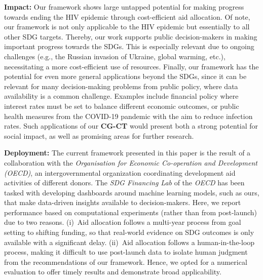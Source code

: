 \documentclass[sigconf]{acmart}
\newcommand{\framework}{\textbf{\mbox{CG-CT}}\xspace}
\begin{document}
\textbf{Impact:} Our framework shows large untapped potential for making progress towards ending the HIV epidemic through cost-efficient aid allocation. Of note, our framework is not only applicable to the HIV epidemic but essentially to all other SDG targets. Thereby, our work supports public decision-makers in making important progress towards the SDGs. This is especially relevant due to ongoing challenges (e.g., the Russian invasion of Ukraine, global warming, etc.), necessitating a more cost-efficient use of resources. Finally, our framework has the potential for even more general applications beyond the SDGs, since it can be relevant for many decision-making problems from public policy, where data availability is a common challenge. Examples include financial policy where interest rates must be set to balance different economic outcomes, or public health measures from the COVID-19 pandemic with the aim to reduce infection rates. Such applications of our \framework would present both a strong potential for social impact, as well as promising areas for further research.

\textbf{Deployment:} The current framework presented in this paper is the result of a collaboration with the \emph{Organisation for Economic Co-operation and Development (OECD)}, an intergovernmental organization coordinating development aid activities of different donors. The \emph{SDG Financing Lab} of the \emph{OECD} has been tasked with developing dashboards around machine learning models, such as ours, that make data-driven insights available to decision-makers. Here, we report performance based on computational experiments (rather than from post-launch) due to two reasons. (i)~Aid allocation follows a multi-year process from goal setting to shifting funding, so that real-world evidence on SDG outcomes is only available with a significant delay. (ii)~Aid allocation follows a human-in-the-loop process, making it difficult to use post-launch data to isolate human judgment from the recommendations of our framework. Hence, we opted for a numerical evaluation to offer timely results and demonstrate broad applicability.   


\end{document}
